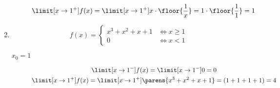 \begin{enumerate}[label={\alph*)}]
\begin{description}
\begin{gather*}
                    \limit[x \to 1^+] f(x)
                        = \limit[x \to 1^+] x \cdot \floor{\frac{1}{x}}
                        = 1 \cdot \floor{\frac{1}{1}}
                        = 1
                \end{gather*}
        \end{description}
    \item
        \begin{equation*}
            f(x) = \begin{cases}
                x^3 + x^2 + x + 1 & \iff x \geq 1\\
                0 & \iff x < 1
            \end{cases}
        \end{equation*}
        \begin{description}
            \item[\(x_0 = 1\)]
                \begin{gather*}
                    \limit[x \to 1^-] f(x)
                        = \limit[x \to 1^-] 0
                        = 0\\
                    \limit[x \to 1^+] f(x)
                        = \limit[x \to 1^+] \parens{x^3 + x^2 + x + 1}
                        = (1 + 1 + 1 + 1)
                        = 4
                \end{gather*}
        \end{description}
\end{enumerate}
